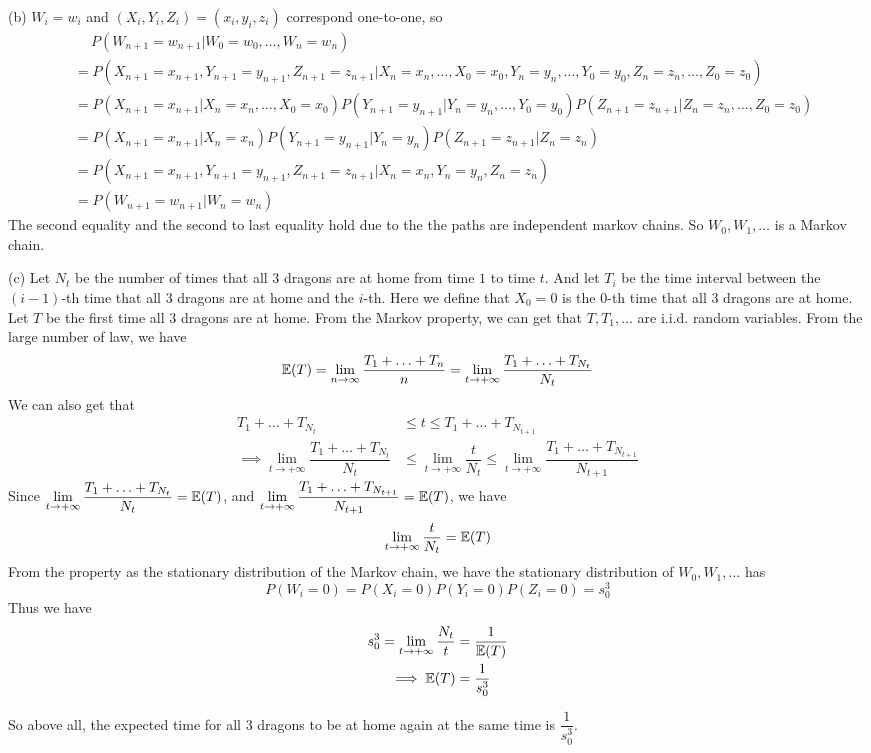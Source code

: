 \begin{homeworkProblem}
(b) $W_i=w_i$ and $(X_i,Y_i,Z_i)=(x_i,y_i,z_i)$ correspond one-to-one, so
\begin{align*}
&\quad\ P(W_{n+1}=w_{n+1}|W_0=w_0,\ldots,W_n=w_n) \\
&= P(X_{n+1}=x_{n+1},Y_{n+1}=y_{n+1},Z_{n+1}=z_{n+1}|X_n=x_n,\ldots,X_0=x_0,Y_n=y_n,\ldots,Y_0=y_0,Z_n=z_n,\ldots,Z_0=z_0) \\
&= P(X_{n+1}=x_{n+1}|X_n=x_n,\ldots,X_0=x_0)P(Y_{n+1}=y_{n+1}|Y_n=y_n,\ldots,Y_0=y_0)P(Z_{n+1}=z_{n+1}|Z_n=z_n,\ldots,Z_0=z_0) \\
&= P(X_{n+1}=x_{n+1}|X_n=x_n)P(Y_{n+1}=y_{n+1}|Y_n=y_n)P(Z_{n+1}=z_{n+1}|Z_n=z_n) \\
&= P(X_{n+1}=x_{n+1},Y_{n+1}=y_{n+1},Z_{n+1}=z_{n+1}|X_n=x_n,Y_n=y_n,Z_n=z_n) \\
&= P(W_{n+1}=w_{n+1}|W_n=w_n)
\end{align*}
The second equality and the second to last equality hold due to the the paths are independent markov chains. So $W_0, W_1, \ldots$ is a Markov chain.

(c) Let $N_t$ be the number of times that all 3 dragons are at home from time $1$ to time $t$. And let $T_i$ be the time interval between the $(i-1)$-th time that all 3 dragons are at home and the $i$-th. Here we define that $X_0=0$ is the $0$-th time that all 3 dragons are at home. Let $T$ be the first time all 3 dragons are at home. From the Markov property, we can get that $T, T_1, \ldots$ are i.i.d. random variables. From the large number of law, we have
$$\mathbb{E}(T)=\lim_{n\to\infty}\dfrac{T_1+\ldots+T_n}{n}=\lim_{t\to+\infty}\dfrac{T_1+\ldots+T_{N_t}}{N_t}$$
We can also get that
\begin{align*}
T_1+\ldots+T_{N_{t}} &\leq t \leq T_1+\ldots+T_{N_{t+1}} \\
\implies \lim_{t\to+\infty}\dfrac{T_1+\ldots+T_{N_{t}}}{N_{t}} &\leq \lim_{t\to+\infty}\dfrac{t}{N_{t}} \leq \lim_{t\to+\infty}\dfrac{T_1+\ldots+T_{N_{t+1}}}{N_{t+1}}
\end{align*}
Since $\lim\limits_{t\to+\infty}\dfrac{T_1+\ldots+T_{N_{t}}}{N_{t}}=\mathbb{E}(T)$, and $\lim\limits_{t\to+\infty}\dfrac{T_1+\ldots+T_{N_{t+1}}}{N_{t+1}}=\mathbb{E}(T)$, we have
$$\lim_{t\to+\infty}\dfrac{t}{N_t}=\mathbb{E}(T)$$
From the property as the stationary distribution of the Markov chain, we have the stationary distribution of $W_0, W_1, \ldots$ has
$$P(W_i=0)=P(X_i=0)P(Y_i=0)P(Z_i=0)=s_0^3$$
Thus we have
\begin{align*}
s_0^3=\lim_{t\to+\infty}\dfrac{N_t}{t} &= \dfrac{1}{\mathbb{E}(T)} \\
\implies \mathbb{E}(T) &= \dfrac{1}{s_0^3}
\end{align*}

So above all, the expected time for all 3 dragons to be at home again at the same time is $\dfrac{1}{s_0^3}$.

\end{homeworkProblem}

\newpage